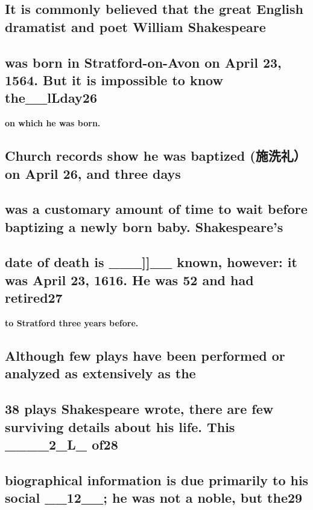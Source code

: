\documentclass[UTF8,11pt]{ctexart}
\begin{document}
\subsection*{\textbf{It is commonly believed that the great English dramatist and poet William Shakespeare}}


\subsection*{\textbf{was born in Stratford-on-Avon on April 23, 1564. But it is impossible to know the\_\_lLday}26}


\textbf{on which he was born.}


\subsection*{\textbf{Church records show he was baptized (施洗礼）on April 26, and three days}}


\subsection*{\textbf{was a customary amount of time to wait before baptizing a newly born baby. Shakespeare's}}


\subsection*{\textbf{date of death is \_\_\_]]\_\_ known, however: it was April 23, 1616. He was 52 and had retired}27}


\textbf{to Stratford three years before.}


\subsection*{\textbf{Although few plays have been performed or analyzed as extensively as the}}


\subsection*{\textbf{38 plays Shakespeare wrote, there are few surviving details about his life. This \_\_\_\_2\_L\_ of}28}


\subsection*{\textbf{biographical information is due primarily to his social \_\_12\_\_; he was not a noble, but the}29}
\end{document}
